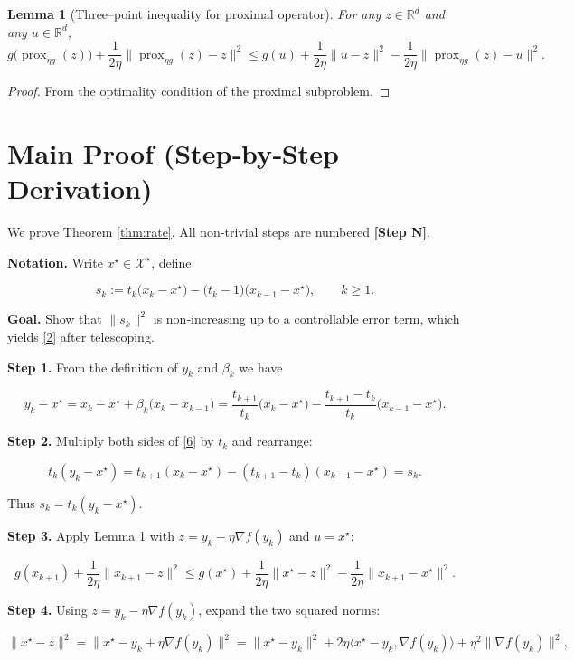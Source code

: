 \documentclass{article}
\newtheorem{lemma}{Lemma}
\newcommand{\prox}{\operatorname{prox}}
\newcommand{\R}{\mathbb{R}}
\begin{document}
\begin{lemma}[Three–point inequality for proximal operator]\label{lem:prox}
For any $z\in\R^{d}$ and any $u\in\R^{d}$,
\[
g\bigl(\prox_{\eta g}(z)\bigr)+\frac{1}{2\eta}\bigl\|\prox_{\eta g}(z)-z\bigr\|^{2}
\le g(u)+\frac{1}{2\eta}\|u-z\|^{2}
-\frac{1}{2\eta}\bigl\|\prox_{\eta g}(z)-u\bigr\|^{2}.
\tag{4}
\]
\end{lemma}
\begin{proof}
From the optimality condition of the proximal subproblem.
\end{proof}

\section*{Main Proof (Step‑by‑Step Derivation)}
We prove Theorem \ref{thm:rate}.  
All non‑trivial steps are numbered \textbf{[Step N]}.

\medskip
\noindent\textbf{Notation.} Write $x^{\star}\in\mathcal{X}^{\star}$, define  

\[
s_{k}:=t_{k}\bigl(x_{k}-x^{\star}\bigr)-\bigl(t_{k}-1\bigr)\bigl(x_{k-1}-x^{\star}\bigr),\qquad k\ge 1.
\tag{5}
\]

\noindent\textbf{Goal.} Show that $\|s_{k}\|^{2}$ is non‑increasing up to a controllable error term, which yields \eqref{2} after telescoping.

\medskip
\noindent\textbf{Step 1.}  From the definition of $y_k$ and $\beta_k$ we have  

\[
y_k-x^{\star}=x_k-x^{\star}+\beta_k\bigl(x_k-x_{k-1}\bigr)
= \frac{t_{k+1}}{t_k}\bigl(x_k-x^{\star}\bigr)-\frac{t_{k+1}-t_k}{t_k}\bigl(x_{k-1}-x^{\star}\bigr).
\tag{6}
\]

\noindent\textbf{Step 2.}  Multiply both sides of \eqref{6} by $t_k$ and rearrange:

\[
t_k(y_k-x^{\star}) = t_{k+1}(x_k-x^{\star})-(t_{k+1}-t_k)(x_{k-1}-x^{\star})
= s_k .
\tag{7}
\]

Thus $s_k = t_k (y_k-x^{\star})$.

\medskip
\noindent\textbf{Step 3.}  Apply Lemma \ref{lem:prox} with $z = y_k-\eta\nabla f(y_k)$ and $u=x^{\star}$:

\[
g(x_{k+1})+\frac{1}{2\eta}\|x_{k+1}-z\|^{2}
\le g(x^{\star})+\frac{1}{2\eta}\|x^{\star}-z\|^{2}
-\frac{1}{2\eta}\|x_{k+1}-x^{\star}\|^{2}.
\tag{8}
\]

\noindent\textbf{Step 4.}  Using $z = y_k-\eta\nabla f(y_k)$, expand the two squared norms:

\[
\|x^{\star}-z\|^{2}= \|x^{\star}-y_k+\eta\nabla f(y_k)\|^{2}
= \|x^{\star}-y_k\|^{2}+2\eta\langle x^{\star}-y_k,\nabla f(y_k)\rangle+\eta^{2}\|\nabla f(y_k)\|^{2},
\tag{9}
\]
\end{document}
